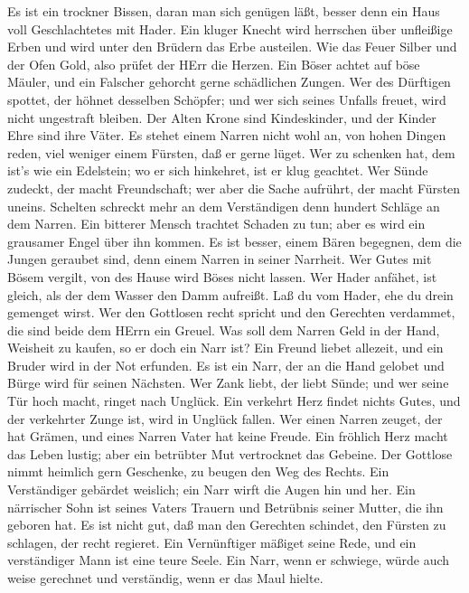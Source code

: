  Es ist ein trockner Bissen, daran man sich genügen läßt,
besser denn ein Haus voll Geschlachtetes mit Hader.  Ein
kluger Knecht wird herrschen über unfleißige Erben und wird unter den
Brüdern das Erbe austeilen.  Wie das Feuer Silber und der
Ofen Gold, also prüfet der HErr die Herzen.  Ein Böser
achtet auf böse Mäuler, und ein Falscher gehorcht gerne schädlichen
Zungen.  Wer des Dürftigen spottet, der höhnet desselben
Schöpfer; und wer sich seines Unfalls freuet, wird nicht ungestraft
bleiben.  Der Alten Krone sind Kindeskinder, und der Kinder
Ehre sind ihre Väter.  Es stehet einem Narren nicht wohl an,
von hohen Dingen reden, viel weniger einem Fürsten, daß er gerne lüget.
 Wer zu schenken hat, dem ist's wie ein Edelstein; wo er
sich hinkehret, ist er klug geachtet.  Wer Sünde zudeckt,
der macht Freundschaft; wer aber die Sache aufrührt, der macht Fürsten
uneins.  Schelten schreckt mehr an dem Verständigen denn
hundert Schläge an dem Narren.  Ein bitterer Mensch
trachtet Schaden zu tun; aber es wird ein grausamer Engel über ihn
kommen.  Es ist besser, einem Bären begegnen, dem die
Jungen geraubet sind, denn einem Narren in seiner Narrheit.
 Wer Gutes mit Bösem vergilt, von des Hause wird Böses
nicht lassen.  Wer Hader anfähet, ist gleich, als der dem
Wasser den Damm aufreißt. Laß du vom Hader, ehe du drein gemenget wirst.
 Wer den Gottlosen recht spricht und den Gerechten
verdammet, die sind beide dem HErrn ein Greuel.  Was soll
dem Narren Geld in der Hand, Weisheit zu kaufen, so er doch ein Narr
ist?  Ein Freund liebet allezeit, und ein Bruder wird in
der Not erfunden.  Es ist ein Narr, der an die Hand gelobet
und Bürge wird für seinen Nächsten.  Wer Zank liebt, der
liebt Sünde; und wer seine Tür hoch macht, ringet nach Unglück.
 Ein verkehrt Herz findet nichts Gutes, und der verkehrter
Zunge ist, wird in Unglück fallen.  Wer einen Narren
zeuget, der hat Grämen, und eines Narren Vater hat keine Freude.
 Ein fröhlich Herz macht das Leben lustig; aber ein
betrübter Mut vertrocknet das Gebeine.  Der Gottlose nimmt
heimlich gern Geschenke, zu beugen den Weg des Rechts.  Ein
Verständiger gebärdet weislich; ein Narr wirft die Augen hin und her.
 Ein närrischer Sohn ist seines Vaters Trauern und
Betrübnis seiner Mutter, die ihn geboren hat.  Es ist nicht
gut, daß man den Gerechten schindet, den Fürsten zu schlagen, der recht
regieret.  Ein Vernünftiger mäßiget seine Rede, und ein
verständiger Mann ist eine teure Seele.  Ein Narr, wenn er
schwiege, würde auch weise gerechnet und verständig, wenn er das Maul
hielte.

